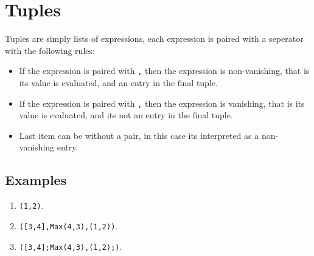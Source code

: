 \section{Tuples}

Tuples are simply lists of expressions, each expression is paired with
a seperator with the following rules:
\begin{itemize}
    \item If the expression is paired with \texttt{,} then the expression is 
        non-vanishing, that is its value is evaluated, and an entry in the final tuple.

    \item If the expression is paired with \texttt{,} then the expression is 
        vanishing, that is its value is evaluated, and its not an entry in the final tuple.

    \item Last item can be without a pair, in this case its interpreted as a non-vanishing entry. 
\end{itemize}


\subsection{Examples}
\begin{enumerate}
    \item \texttt{(1,2)}.
    \item \texttt{([3,4],Max(4,3),(1,2))}.
    \item \texttt{([3,4];Max(4,3),(1,2);)}.
\end{enumerate}

